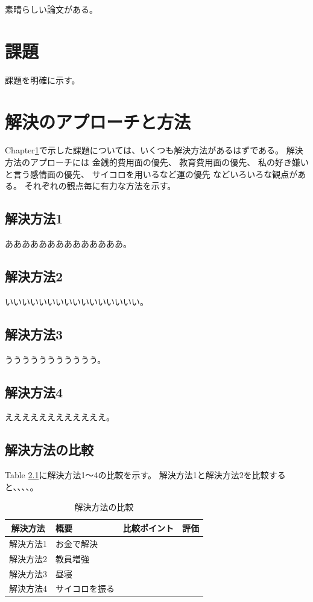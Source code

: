 \documentclass[senior,final,11pt]{iputde-thesis}
\begin{document}
素晴らしい論文\cite{Takemoto-SmartShadow2013}がある。

\chapter{課題}\label{kadai}

課題を明確に示す。

\chapter{解決のアプローチと方法}\label{approach}

Chapter\ref{kadai}で示した課題については、いくつも解決方法があるはずである。
解決方法のアプローチには
金銭的費用面の優先、
教育費用面の優先、
私の好き嫌いと言う感情面の優先、
サイコロを用いるなど運の優先
などいろいろな観点がある。
それぞれの観点毎に有力な方法を示す。

\section{解決方法1}

ああああああああああああああ。

\section{解決方法2}

いいいいいいいいいいいいいいいい。

\section{解決方法3}

ううううううううううう。

\section{解決方法4}

ええええええええええええ。

\section{解決方法の比較}
Table \ref{tab:kaiketsuhouhou}に解決方法1～4の比較を示す。
解決方法1と解決方法2を比較すると、、、、。

\begin{table}[htb]
    \centering
    \begin{tabular}{|c|l|l|c|}
        \hline
        解決方法& 概要&比較ポイント & 評価 \\
        \hline
        解決方法1& お金で解決& & \\
        \hline
        解決方法2& 教員増強& & \\
        \hline
        解決方法3& 昼寝& & \\
        \hline
        解決方法4& サイコロを振る& & \\
        \hline
    \end{tabular}
    \caption{解決方法の比較}
    \label{tab:kaiketsuhouhou}
\end{table}
\end{document}
